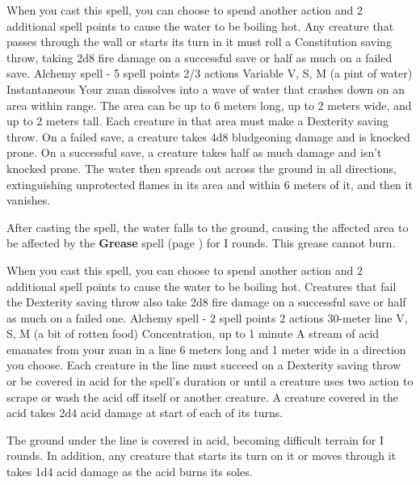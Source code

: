         When you cast this spell, you can choose to spend another action and 2 additional spell points to cause the water to be boiling hot.
        Any creature that passes through the wall or starts its turn in it must roll a Constitution saving throw, taking 2d8 fire damage on a successful save or half as much on a failed save.
        {Alchemy spell - 5 spell points}
        {2/3 actions}
        {Variable}
        {V, S, M (a pint of water)}
        {Instantaneous}
        Your zuan dissolves into a wave of water that crashes down on an area within range.
        The area can be up to 6 meters long, up to 2 meters wide, and up to 2 meters tall.
        Each creature in that area must make a Dexterity saving throw.
        On a failed save, a creature takes 4d8 bludgeoning damage and is knocked prone.
        On a successful save, a creature takes half as much damage and isn't knocked prone.
        The water then spreads out across the ground in all directions, extinguishing unprotected flames in its area and within 6 meters of it, and then it vanishes.

        After casting the spell, the water falls to the ground, causing the affected area to be affected by the \textbf{Grease} spell (page \pageref{spell::grease}) for I rounds.
        This grease cannot burn.

        When you cast this spell, you can choose to spend another action and 2 additional spell points to cause the water to be boiling hot.
        Creatures that fail the Dexterity saving throw also take 2d8 fire damage on a successful save or half as much on a failed one.
        {Alchemy spell - 2 spell points}
        {2 actions}
        {30-meter line}
        {V, S, M (a bit of rotten food)}
        {Concentration, up to 1 minute}
        A stream of acid emanates from your zuan in a line 6 meters long and 1 meter wide in a direction you choose.
        Each creature in the line must succeed on a Dexterity saving throw or be covered in acid for the spell's duration or until a creature uses two action to scrape or wash the acid off itself or another creature.
        A creature covered in the acid takes 2d4 acid damage at start of each of its turns.

        The ground under the line is covered in acid, becoming difficult terrain for I rounds.
        In addition, any creature that starts its turn on it or moves through it takes 1d4 acid damage as the acid burns its soles.

